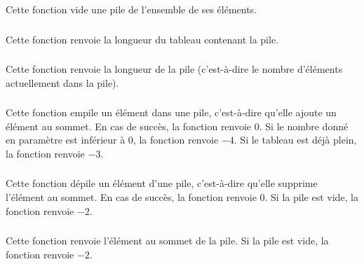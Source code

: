 \noindent Cette fonction vide une pile de l'ensemble de ses éléments.


\subsubsection*{}

\noindent Cette fonction renvoie la longueur du tableau contenant la pile.


\subsubsection*{}

\noindent Cette fonction renvoie la longueur de la pile (c'est-à-dire le nombre d'éléments actuellement dans la pile).


\subsubsection*{}

\noindent Cette fonction empile un élément dans une pile, c'est-à-dire qu'elle ajoute un élément au sommet.
En cas de succès, la fonction renvoie $ 0 $.
Si le nombre donné en paramètre est inférieur à $ 0 $, la fonction renvoie $ -4 $.
Si le tableau est déjà plein, la fonction renvoie $ -3 $.


\subsubsection*{}

\noindent Cette fonction dépile un élément d'une pile, c'est-à-dire qu'elle supprime l'élément au sommet.
En cas de succès, la fonction renvoie $ 0 $.
Si la pile est vide, la fonction renvoie $ -2 $.


\subsubsection*{}

\noindent Cette fonction renvoie l'élément au sommet de la pile.
Si la pile est vide, la fonction renvoie $ -2 $.


\subsubsection*{}

